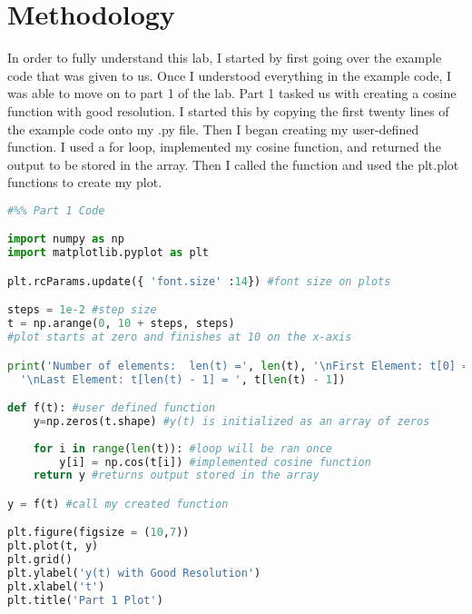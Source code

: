 \documentclass[12pt]{report}
\begin{document}
\section{Methodology}

In order to fully understand this lab, I started by first going over the example code that was given to us. Once I understood everything in the example code, I was able to move on to part 1 of the lab. Part 1 tasked us with creating a cosine function with good resolution. I started this by copying the first twenty lines of the example code onto my .py file. Then I began creating my user-defined function. I used a for loop, implemented my cosine function, and returned the output to be stored in the array. Then I called the function and used the plt.plot functions to create my plot. 
\begin{lstlisting}[language=Python]
#%% Part 1 Code

import numpy as np
import matplotlib.pyplot as plt

plt.rcParams.update({ 'font.size' :14}) #font size on plots

steps = 1e-2 #step size
t = np.arange(0, 10 + steps, steps) 
#plot starts at zero and finishes at 10 on the x-axis

print('Number of elements:  len(t) =', len(t), '\nFirst Element: t[0] =', t[0],
  '\nLast Element: t[len(t) - 1] = ', t[len(t) - 1])

def f(t): #user defined function
    y=np.zeros(t.shape) #y(t) is initialized as an array of zeros
    
    for i in range(len(t)): #loop will be ran once
        y[i] = np.cos(t[i]) #implemented cosine function
    return y #returns output stored in the array

y = f(t) #call my created function

plt.figure(figsize = (10,7))
plt.plot(t, y)
plt.grid()
plt.ylabel('y(t) with Good Resolution')
plt.xlabel('t')
plt.title('Part 1 Plot')
\end{lstlisting}
\end{document}

